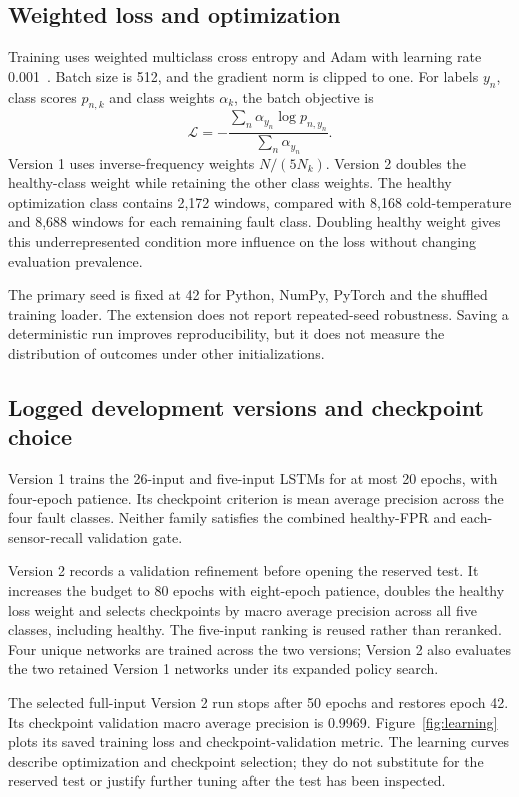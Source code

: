 \subsection{Weighted loss and optimization}
Training uses weighted multiclass cross entropy and Adam with learning rate 0.001~\cite{kingma2015}. Batch size is 512, and the gradient norm is clipped to one. For labels $y_n$, class scores $p_{n,k}$ and class weights $\alpha_k$, the batch objective is
\begin{equation}
\mathcal{L}=-\frac{\sum_n\alpha_{y_n}\log p_{n,y_n}}{\sum_n\alpha_{y_n}}.
\end{equation}
Version 1 uses inverse-frequency weights $N/(5N_k)$. Version 2 doubles the healthy-class weight while retaining the other class weights. The healthy optimization class contains 2,172 windows, compared with 8,168 cold-temperature and 8,688 windows for each remaining fault class. Doubling healthy weight gives this underrepresented condition more influence on the loss without changing evaluation prevalence.

The primary seed is fixed at 42 for Python, NumPy, PyTorch and the shuffled training loader. The extension does not report repeated-seed robustness. Saving a deterministic run improves reproducibility, but it does not measure the distribution of outcomes under other initializations.

\subsection{Logged development versions and checkpoint choice}
Version 1 trains the 26-input and five-input LSTMs for at most 20 epochs, with four-epoch patience. Its checkpoint criterion is mean average precision across the four fault classes. Neither family satisfies the combined healthy-FPR and each-sensor-recall validation gate.

Version 2 records a validation refinement before opening the reserved test. It increases the budget to 80 epochs with eight-epoch patience, doubles the healthy loss weight and selects checkpoints by macro average precision across all five classes, including healthy. The five-input ranking is reused rather than reranked. Four unique networks are trained across the two versions; Version 2 also evaluates the two retained Version 1 networks under its expanded policy search.

The selected full-input Version 2 run stops after 50 epochs and restores epoch 42. Its checkpoint validation macro average precision is 0.9969. Figure~\ref{fig:learning} plots its saved training loss and checkpoint-validation metric. The learning curves describe optimization and checkpoint selection; they do not substitute for the reserved test or justify further tuning after the test has been inspected.

